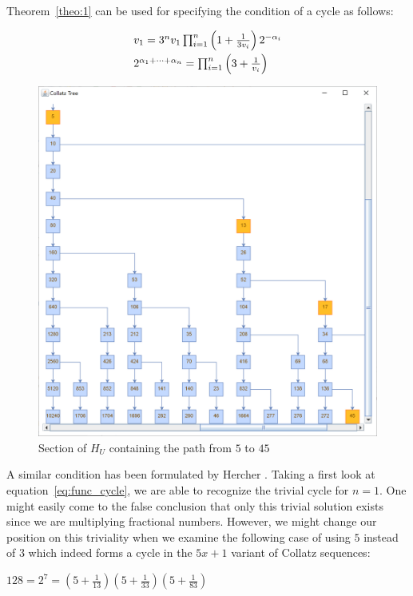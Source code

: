 \noindent
Theorem~\ref{theo:1} can be used for specifying the condition of a cycle as follows:

\begin{equation}
\label{eq:func_cycle}
\begin{array}{l}
v_{1}=3^nv_1\prod_{i=1}^{n}\left(1+\frac{1}{3v_i}\right)2^{-\alpha_i}
\\[\medskipamount]
2^{\alpha_1+\cdots+\alpha_n}=\prod_{i=1}^{n}\left(3+\frac{1}{v_i}\right)
\end{array}
\end{equation}

\begin{figure}
	\includegraphics[width=1.00\textwidth]{figures/h_u.png}
	\caption{Section of $H_U$ containing the path from $5$ to $45$}
	\label{fig:3}
\end{figure}

A similar condition has been formulated by Hercher \cite{Ref_Hercher}. Taking a first look at equation~\ref{eq:func_cycle}, we are able to recognize the trivial cycle for $n=1$. One might easily come to the false conclusion that only this trivial solution exists since we are multiplying fractional numbers. However, we might change our position on this triviality when we examine the following case of using $5$ instead of $3$ which indeed forms a cycle in the $5x+1$ variant of Collatz sequences:
\begin{center}
	$128=2^7=\left(5+\frac{1}{13}\right)\left(5+\frac{1}{33}\right)
	\left(5+\frac{1}{83}\right)$
\end{center}

